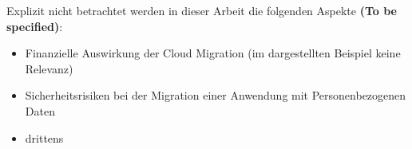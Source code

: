 Explizit nicht betrachtet werden in dieser Arbeit die folgenden Aspekte \textbf{(To be specified)}:
\begin{itemize}
\item Finanzielle Auswirkung der Cloud Migration (im dargestellten Beispiel keine Relevanz)
\item Sicherheitsrisiken bei der Migration einer Anwendung mit Personenbezogenen Daten
\item drittens
\end{itemize}

\pagebreak



